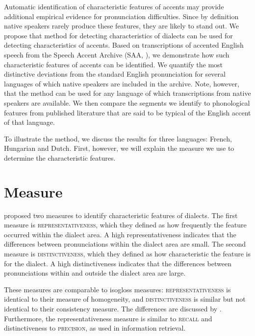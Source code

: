 \documentclass[output=paper]{LSP/langsci}
\begin{document}
Automatic identification of characteristic features of accents may provide additional empirical evidence for pronunciation difficulties. Since by definition native speakers rarely produce these features, they are likely to stand out. We propose that  method for detecting characteristics of dialects can be used for detecting characteristics of accents. Based on transcriptions of accented English speech from the Speech Accent Archive (SAA, \citealt{weinberger_speech_2011}), we demonstrate how such characteristic features of accents can be identified. We quantify the most distinctive deviations from the standard English pronunciation for several languages of which native speakers are included in the archive. Note, however, that the method can be used for any language of which transcriptions from native speakers are available. We then compare the segments we identify to phonological features from published literature that are said to be typical of the English accent of that language.

To illustrate the method, we discuss the results for three languages: French, Hungarian and Dutch. First, however, we will explain the measure we use to determine the characteristic features.

\section{Measure}
\label{s:measure}
\citet{wieling_bipartite_2011} proposed two measures to identify characteristic features of dialects. The first measure is \textsc{representativeness}, which they defined as how frequently the feature occurred within the dialect area. A high representativeness indicates that the differences between pronunciations within the dialect area are small. The second measure is \textsc{distinctiveness}, which they defined as how characteristic the feature is for the dialect. A high distinctiveness indicates that the differences between pronunciations within and outside the dialect area are large. 

These measures are comparable to  isogloss measures: \textsc{representativeness} is identical to their measure of homogeneity, and \textsc{distinctiveness} is similar but not identical to their consistency measure. The differences are discussed by \citet{wieling_analyzing_2014}. Furthermore, the representativeness measure is similar to \textsc{recall} and distinctiveness to \textsc{precision}, as used in information retrieval.
\end{document}
